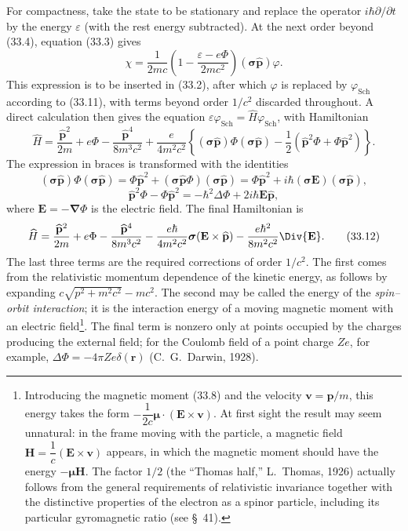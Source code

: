For compactness, take the state to be stationary and replace the operator $i\hbar\partial/\partial t$ by the energy $\varepsilon$ (with the rest energy subtracted). At the next order beyond (33.4), equation (33.3) gives
\[
\chi=\frac1{2mc}\left(1-\frac{\varepsilon-e\Phi}{2mc^2}\right)
(\boldsymbol{\sigma}\widehat{\mathbf p})\varphi.
\]
This expression is to be inserted in (33.2), after which $\varphi$ is replaced by $\varphi_{\mathrm{Sch}}$ according to (33.11), with terms beyond order $1/c^2$ discarded throughout. A direct calculation then gives
the equation $\varepsilon\varphi_{\mathrm{Sch}}=\widehat H\varphi_{\mathrm{Sch}}$, with Hamiltonian
\[
\widehat H=\frac{\widehat{\mathbf p}^{2}}{2m}+e\Phi
-\frac{\widehat{\mathbf p}^{4}}{8m^3c^2}
+\frac e{4m^2c^2}\left\{(\boldsymbol{\sigma}\widehat{\mathbf p})\Phi
(\boldsymbol{\sigma}\widehat{\mathbf p})
-\frac12(\widehat{\mathbf p}^{2}\Phi+\Phi\widehat{\mathbf p}^{2})\right\}.
\]
The expression in braces is transformed with the identities
\[
(\boldsymbol{\sigma}\widehat{\mathbf p})\Phi
(\boldsymbol{\sigma}\widehat{\mathbf p})
=\Phi\widehat{\mathbf p}^{2}
+(\boldsymbol{\sigma}\widehat{\mathbf p}\Phi)(\boldsymbol{\sigma}\widehat{\mathbf p})
=\Phi\widehat{\mathbf p}^{2}
+i\hbar(\boldsymbol{\sigma}\mathbf E)(\boldsymbol{\sigma}\widehat{\mathbf p}),
\]
\[
\widehat{\mathbf p}^{2}\Phi-\Phi\widehat{\mathbf p}^{2}
=-\hbar^2\Delta\Phi+2i\hbar\mathbf E\widehat{\mathbf p},
\]
where $\mathbf E=-\boldsymbol\nabla\Phi$ is the electric field. The final Hamiltonian is
\begin{equation}
\widehat H=\frac{\widehat{\mathbf p}^{2}}{2m}+e\Phi
-\frac{\widehat{\mathbf p}^{4}}{8m^3c^2}
-\frac{e\hbar}{4m^2c^2}\boldsymbol{\sigma}(\mathbf E\times\widehat{\mathbf p})
-\frac{e\hbar^2}{8m^2c^2}\Div{\mathbf E}.
\tag{33.12}
\end{equation}
The last three terms are the required corrections of order $1/c^2$. The first comes from the relativistic momentum dependence of the kinetic energy, as follows by expanding $c\sqrt{p^2+m^2c^2}-mc^2$. The second may be called the energy of the \emph{spin--orbit interaction}; it is the interaction energy of a moving magnetic moment with an electric field\footnote{Introducing the magnetic moment (33.8) and the velocity $\mathbf v=\mathbf p/m$, this energy takes the form $-\dfrac1{2c}\boldsymbol{\mu}\cdot(\mathbf E\times\mathbf v)$. At first sight the result may seem unnatural: in the frame moving with the particle, a magnetic field $\mathbf H=\dfrac1c(\mathbf E\times\mathbf v)$ appears, in which the magnetic moment should have the energy $-\boldsymbol{\mu}\mathbf H$. The factor $1/2$ (the ``Thomas half,'' L.~Thomas, 1926) actually follows from the general requirements of relativistic invariance together with the distinctive properties of the electron as a spinor particle, including its particular gyromagnetic ratio (see \S~41).}. The final term is nonzero only at points occupied by the charges producing the external field; for the Coulomb field of a point charge $Ze$, for example, $\Delta\Phi=-4\pi Ze\delta(\mathbf r)$ (C.~G.~Darwin, 1928).

